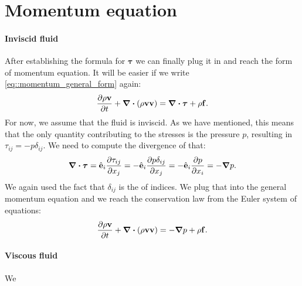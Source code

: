 \documentclass[a4paper]{article}
\begin{document}
\section{Momentum equation}
\paragraph{Inviscid fluid}
After establishing the formula for \(\bm{\tau}\) we can finally plug it in and
reach the  form of momentum equation. It will be easier if we write
\autoref{eq::momentum_general_form} again:
\[
	\pdv{\rho \vb{v}}{t}
	+ \div{\qty(\rho\vb{v}\vb{v} )}  =
	\div\bm{\tau} + \rho\vb{f}.
\]
For now, we assume that the fluid is inviscid. As we have mentioned, this
means that the only quantity contributing to the stresses is the pressure
\(p\), resulting in \(\tau_{ij} = -p\delta_{ij}\). We need to compute the
divergence of that:
\[
	\div{\bm{\tau}}
	= \hat{\vb{e}}_i \pdv{\tau_{ij}}{x_j}
	= - \hat{\vb{e}}_i \pdv{p \delta_{ij}}{x_j}
	= - \hat{\vb{e}}_i \pdv{p}{x_i}
	= -\grad{p}.
\]
We again used the fact that \(\delta_{ij}\) is the  of indices.
We plug that into the general momentum equation and we reach the conservation law
from the Euler system of equations:
\begin{equation}
	\pdv{\rho \vb{v}}{t}
	+ \div{\qty(\rho\vb{v}\vb{v} )}  =
	- \grad{p}
	+ \rho\vb{f}.
\end{equation}

\paragraph{Viscous fluid}
We
\end{document}
